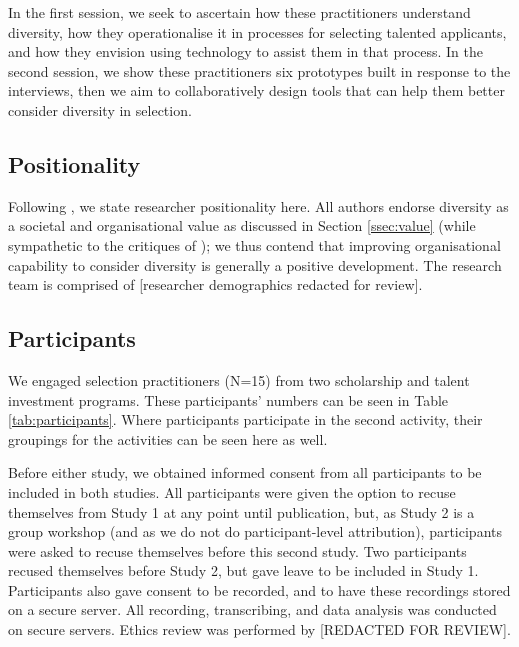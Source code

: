 In the first session, we seek to ascertain how these practitioners understand diversity, how they operationalise it in processes for selecting talented applicants, and how they envision using technology to assist them in that process. In the second session, we show these practitioners six prototypes built in response to the interviews, then we aim to collaboratively design tools that can help them better consider diversity in selection.

\subsection{Positionality}
Following \textcite{Venn-Wycherley_Kharrufa_Lechelt_Nicholson_Howland_Almjally_Trory_Sarangapani_2024}, we state researcher positionality here. All authors endorse diversity as a societal and organisational value as discussed in Section \ref{ssec:value} (while sympathetic to the critiques of \textcite{Ahmed_2012,Warikoo_2019}); we thus contend that improving organisational capability to consider diversity is generally a positive development. The research team is comprised of [researcher demographics redacted for review].

\subsection{Participants}
We engaged selection practitioners (N=15) from two scholarship and talent investment programs. These participants' numbers can be seen in Table \ref{tab:participants}. Where participants participate in the second activity, their groupings for the activities can be seen here as well.

Before either study, we obtained informed consent from all participants to be included in both studies. All participants were given the option to recuse themselves from Study 1 at any point until publication, but, as Study 2 is a group workshop (and as we do not do participant-level attribution), participants were asked to recuse themselves before this second study. Two participants recused themselves before Study 2, but gave leave to be included in Study 1. Participants also gave consent to be recorded, and to have these recordings stored on a secure server. All recording, transcribing, and data analysis was conducted on secure servers. Ethics review was performed by [REDACTED FOR REVIEW].

